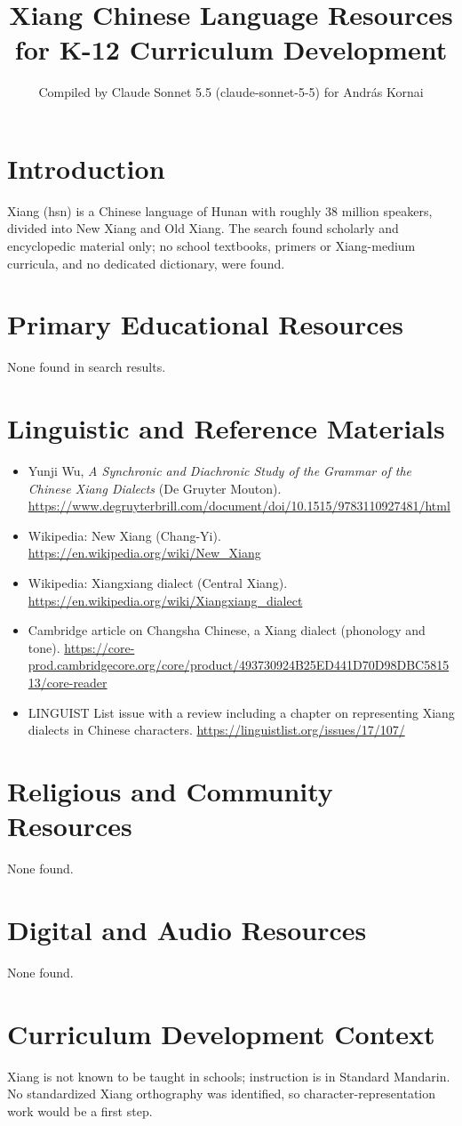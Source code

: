 \documentclass[12pt]{article}
\title{Xiang Chinese Language Resources for K-12 Curriculum Development}
\author{Compiled by Claude Sonnet 5.5 (claude-sonnet-5-5) for Andr\'as Kornai}
\date{}
\begin{document}
\maketitle

\section{Introduction}
Xiang (hsn) is a Chinese language of Hunan with roughly 38 million speakers, divided into New Xiang and Old Xiang. The search found scholarly and encyclopedic material only; no school textbooks, primers or Xiang-medium curricula, and no dedicated dictionary, were found.

\section{Primary Educational Resources}
None found in search results.

\section{Linguistic and Reference Materials}
\begin{itemize}
\item Yunji Wu, \emph{A Synchronic and Diachronic Study of the Grammar of the Chinese Xiang Dialects} (De Gruyter Mouton). \url{https://www.degruyterbrill.com/document/doi/10.1515/9783110927481/html}
\item Wikipedia: New Xiang (Chang-Yi). \url{https://en.wikipedia.org/wiki/New_Xiang}
\item Wikipedia: Xiangxiang dialect (Central Xiang). \url{https://en.wikipedia.org/wiki/Xiangxiang_dialect}
\item Cambridge article on Changsha Chinese, a Xiang dialect (phonology and tone). \url{https://core-prod.cambridgecore.org/core/product/493730924B25ED441D70D98DBC581513/core-reader}
\item LINGUIST List issue with a review including a chapter on representing Xiang dialects in Chinese characters. \url{https://linguistlist.org/issues/17/107/}
\end{itemize}

\section{Religious and Community Resources}
None found.

\section{Digital and Audio Resources}
None found.

\section{Curriculum Development Context}
Xiang is not known to be taught in schools; instruction is in Standard Mandarin. No standardized Xiang orthography was identified, so character-representation work would be a first step.
\end{document}
